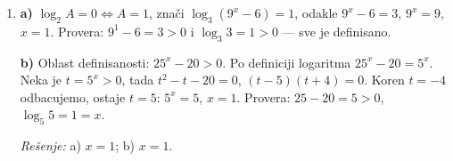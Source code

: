\begin{enumerate}[label=\arabic*.]
\textbf{b)} Oblast definisanosti: $x\ge 0$. Neka je $t=2^{\sqrt{x}}\ge 1$, tada $4^{\sqrt{x}}=t^{2}$ i $t^{2}-5t+4=0$, $(t-1)(t-4)=0$, $t=1$ ili $t=4$. Iz $2^{\sqrt{x}}=2^{0}$: $\sqrt{x}=0$, $x=0$; iz $2^{\sqrt{x}}=2^{2}$: $\sqrt{x}=2$, $x=4$.

\emph{Rešenje:} a) $x=3$; b) $x\in\{0,\,4\}$.

\item \textbf{a)} $\log_{2}A=0\Leftrightarrow A=1$, znači $\log_{3}(9^{x}-6)=1$, odakle $9^{x}-6=3$, $9^{x}=9$, $x=1$. Provera: $9^{1}-6=3>0$ i $\log_{3}3=1>0$ — sve je definisano.

\textbf{b)} Oblast definisanosti: $25^{x}-20>0$. Po definiciji logaritma $25^{x}-20=5^{x}$. Neka je $t=5^{x}>0$, tada $t^{2}-t-20=0$, $(t-5)(t+4)=0$. Koren $t=-4$ odbacujemo, ostaje $t=5$: $5^{x}=5$, $x=1$. Provera: $25-20=5>0$, $\log_{5}5=1=x$.

\emph{Rešenje:} a) $x=1$; b) $x=1$.
\end{enumerate}
\clearpage
